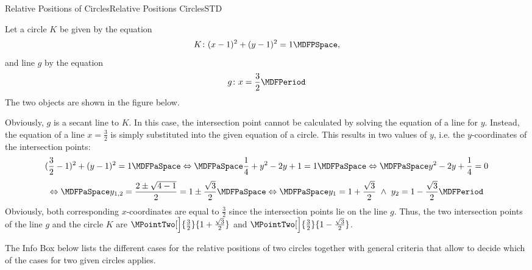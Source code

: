 \begin{MXContent}{Relative Positions of Circles}{Relative Positions Circles}{STD}
\begin{MExample}
Let a circle $K$ be given by the equation
\[
 K\colon (x-1)^2+(y-1)^2=1\MDFPSpace ,
\]
and line $g$ by the equation
\[
 g\colon x=\frac{3}{2}\MDFPeriod
\]
The two objects are shown in the figure below.
\begin{center}
\end{center} 
Obviously, $g$ is a secant line to $K$. In this case, the intersection point cannot be calculated 
by solving the equation of a line for $y$. Instead, the equation of a line $x=\frac{3}{2}$ is simply 
substituted into the given equation of a circle. This results in two values of $y$, i.e. the $y$-coordinates 
of the intersection points:
\[
  (\frac{3}{2}-1)^2+(y-1)^2=1\MDFPaSpace\Leftrightarrow\MDFPaSpace \frac{1}{4}+y^2-2y+1=1 \MDFPaSpace\Leftrightarrow\MDFPaSpace y^2-2y+\frac{1}{4}=0
\]
\[
 \Leftrightarrow\MDFPaSpace y_{1,2}=\frac{2\pm\sqrt{4-1}}{2}=1\pm\frac{\sqrt{3}}{2}\MDFPaSpace\Leftrightarrow\MDFPaSpace y_1=1+\frac{\sqrt{3}}{2}\ \wedge\ y_2=1-\frac{\sqrt{3}}{2}\MDFPeriod
\]
Obviously, both corresponding $x$-coordinates are equal to $\frac{3}{2}$ since the intersection points lie 
on the line $g$. Thus, the two intersection points of the line $g$ and the circle $K$ are 
$\MPointTwo[\Big]{\frac{3}{2}}{1+\frac{\sqrt{3}}{2}}$ and $\MPointTwo[\Big]{\frac{3}{2}}{1-\frac{\sqrt{3}}{2}}$.
\end{MExample}

The Info Box below lists the different cases for the relative positions of two circles together with general 
criteria that allow to decide which of the cases for two given circles applies.


\end{MXContent}
